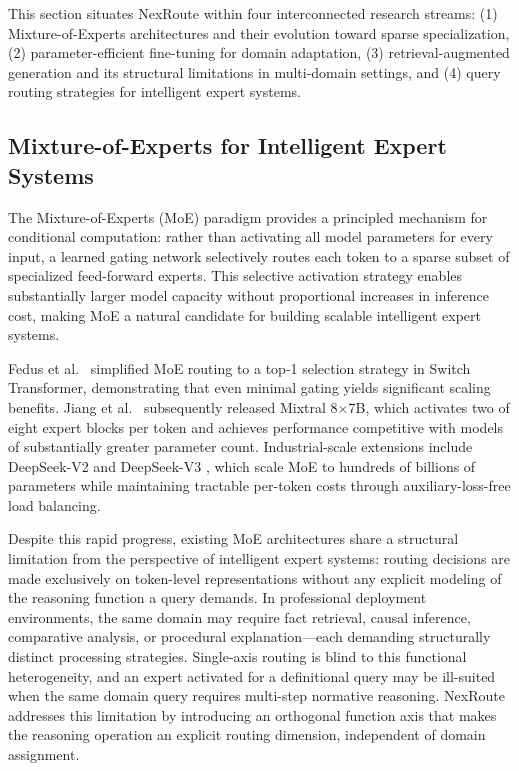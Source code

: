 \documentclass[a4paper,fleql]{cas-sc}
\begin{document}
This section situates NexRoute within four interconnected research streams:
(1) Mixture-of-Experts architectures and their evolution toward sparse
specialization, (2) parameter-efficient fine-tuning for domain adaptation,
(3) retrieval-augmented generation and its structural limitations in
multi-domain settings, and (4) query routing strategies for intelligent expert
systems.

\subsection{Mixture-of-Experts for Intelligent Expert Systems}
The Mixture-of-Experts (MoE) paradigm \citep{shazeer2017outrageously} provides
a principled mechanism for conditional computation: rather than activating all
model parameters for every input, a learned gating network selectively routes
each token to a sparse subset of specialized feed-forward experts. This
selective activation strategy enables substantially larger model capacity
without proportional increases in inference cost, making MoE a natural
candidate for building scalable intelligent expert systems.

Fedus et al.\ \citep{fedus2022switch} simplified MoE routing to a top-1
selection strategy in Switch Transformer, demonstrating that even minimal
gating yields significant scaling benefits. Jiang et al.\ \citep{jiang2024mixtral}
subsequently released Mixtral 8$\times$7B, which activates two of eight expert
blocks per token and achieves performance competitive with models of
substantially greater parameter count. Industrial-scale extensions include
DeepSeek-V2 \citep{deepseekai2024deepseekv2} and DeepSeek-V3
\citep{deepseekai2025deepseekv3}, which scale MoE to hundreds of billions of
parameters while maintaining tractable per-token costs through
auxiliary-loss-free load balancing.

Despite this rapid progress, existing MoE architectures share a structural
limitation from the perspective of intelligent expert systems: routing decisions
are made exclusively on token-level representations without any explicit
modeling of the reasoning function a query demands. In professional deployment
environments, the same domain may require fact retrieval, causal inference,
comparative analysis, or procedural explanation---each demanding structurally
distinct processing strategies. Single-axis routing is blind to this
functional heterogeneity, and an expert activated for a definitional query
may be ill-suited when the same domain query requires multi-step normative
reasoning. NexRoute addresses this limitation by introducing an orthogonal
function axis that makes the reasoning operation an explicit routing
dimension, independent of domain assignment.
\end{document}
